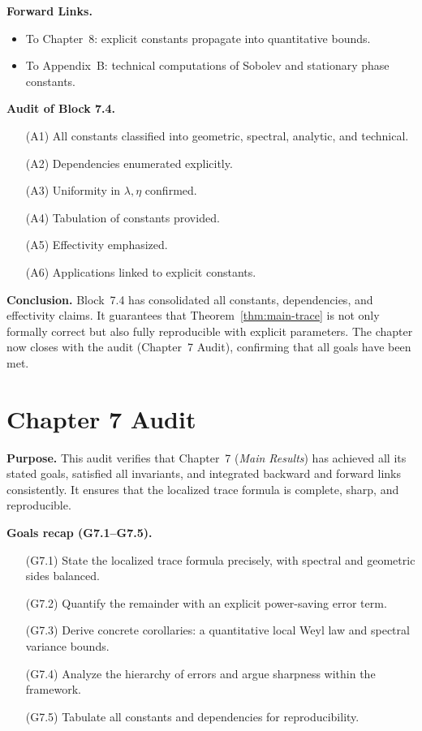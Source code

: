 \medskip

\noindent\textbf{Forward Links.}
\begin{itemize}
  \item To Chapter~8: explicit constants propagate into quantitative bounds.
  \item To Appendix~B: technical computations of Sobolev and stationary phase constants.
\end{itemize}

\medskip

\noindent\textbf{Audit of Block 7.4.}
\begin{itemize}
  \item[(A1)] All constants classified into geometric, spectral, analytic, and technical.
  \item[(A2)] Dependencies enumerated explicitly.
  \item[(A3)] Uniformity in $\lambda,\eta$ confirmed.
  \item[(A4)] Tabulation of constants provided.
  \item[(A5)] Effectivity emphasized.
  \item[(A6)] Applications linked to explicit constants.
\end{itemize}

\medskip

\noindent\textbf{Conclusion.}
Block~7.4 has consolidated all constants, dependencies, and effectivity claims.  
It guarantees that Theorem~\ref{thm:main-trace} is not only formally correct but also fully reproducible with explicit parameters.  
The chapter now closes with the audit (Chapter~7 Audit), confirming that all goals have been met.



\section*{Chapter 7 Audit}

\noindent\textbf{Purpose.}
This audit verifies that Chapter~7 (\emph{Main Results}) has achieved all its stated goals, satisfied all invariants, and integrated backward and forward links consistently.  
It ensures that the localized trace formula is complete, sharp, and reproducible.

\medskip

\noindent\textbf{Goals recap (G7.1–G7.5).}
\begin{itemize}
  \item[(G7.1)] State the localized trace formula precisely, with spectral and geometric sides balanced.  
  \item[(G7.2)] Quantify the remainder with an explicit power-saving error term.  
  \item[(G7.3)] Derive concrete corollaries: a quantitative local Weyl law and spectral variance bounds.  
  \item[(G7.4)] Analyze the hierarchy of errors and argue sharpness within the framework.  
  \item[(G7.5)] Tabulate all constants and dependencies for reproducibility.
\end{itemize}

